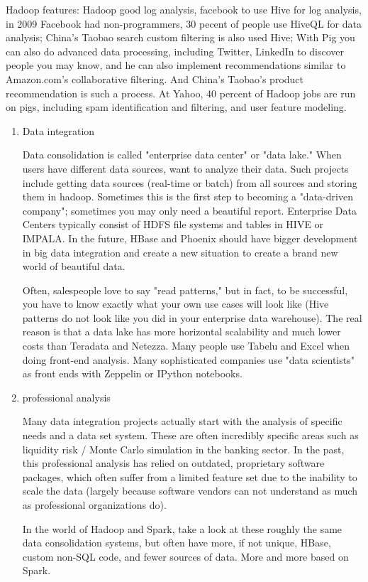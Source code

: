 \documentclass[sigconf]{acmart}
\begin{document}
\par Hadoop features: Hadoop good log analysis, facebook to use Hive for log analysis, in 2009 Facebook had non-programmers, 30 pecent of people use HiveQL for data analysis; China's Taobao search custom filtering is also used Hive; With Pig you can also do advanced data processing, including Twitter, LinkedIn to discover people you may know, and he can also implement recommendations similar to Amazon.com's collaborative filtering. And China's Taobao's product recommendation is such a process. At Yahoo, 40 percent of Hadoop jobs are run on pigs, including spam identification and filtering, and user feature modeling.

\begin{enumerate}
  \item  Data integration
  \par Data consolidation is called "enterprise data center" or "data lake." When users have different data sources, want to analyze their data. Such projects include getting data sources (real-time or batch) from all sources and storing them in hadoop. Sometimes this is the first step to becoming a "data-driven company"; sometimes you may only need a beautiful report. Enterprise Data Centers typically consist of HDFS file systems and tables in HIVE or IMPALA. In the future, HBase and Phoenix should have bigger development in big data integration and create a new situation to create a brand new world of beautiful data.
  \par  Often, salespeople love to say "read patterns," but in fact, to be successful, you have to know exactly what your own use cases will look like (Hive patterns do not look like you did in your enterprise data warehouse). The real reason is that a data lake has more horizontal scalability and much lower costs than Teradata and Netezza. Many people use Tabelu and Excel when doing front-end analysis. Many sophisticated companies use "data scientists" as front ends with Zeppelin or IPython notebooks.

  \item professional analysis
  \par Many data integration projects actually start with the analysis of specific needs and a data set system. These are often incredibly specific areas such as liquidity risk / Monte Carlo simulation in the banking sector. In the past, this professional analysis has relied on outdated, proprietary software packages, which often suffer from a limited feature set due to the inability to scale the data (largely because software vendors can not understand as much as professional organizations do).
  \par  In the world of Hadoop and Spark, take a look at these roughly the same data consolidation systems, but often have more, if not unique, HBase, custom non-SQL code, and fewer sources of data. More and more based on Spark.



\end{enumerate}
\end{document}

